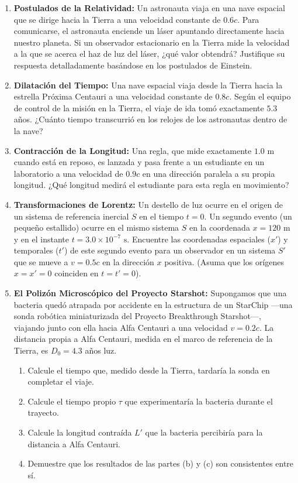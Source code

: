 \documentclass[11pt,a4paper]{book}
\begin{document}
\begin{enumerate}

    \item \textbf{Postulados de la Relatividad:} Un astronauta viaja en una nave espacial que se dirige hacia la Tierra a una velocidad constante de $0.6c$. Para comunicarse, el astronauta enciende un láser apuntando directamente hacia nuestro planeta. Si un observador estacionario en la Tierra mide la velocidad a la que se acerca el haz de luz del láser, ¿qué valor obtendrá? Justifique su respuesta detalladamente basándose en los postulados de Einstein.

    \item \textbf{Dilatación del Tiempo:} Una nave espacial viaja desde la Tierra hacia la estrella Próxima Centauri a una velocidad constante de $0.8c$. Según el equipo de control de la misión en la Tierra, el viaje de ida tomó exactamente $5.3$ años. ¿Cuánto tiempo transcurrió en los relojes de los astronautas dentro de la nave?
    
    \item \textbf{Contracción de la Longitud:} Una regla, que mide exactamente $1.0 \text{ m}$ cuando está en reposo, es lanzada y pasa frente a un estudiante en un laboratorio a una velocidad de $0.9c$ en una dirección paralela a su propia longitud. ¿Qué longitud medirá el estudiante para esta regla en movimiento?

    \item \textbf{Transformaciones de Lorentz:} Un destello de luz ocurre en el origen de un sistema de referencia inercial $S$ en el tiempo $t=0$. Un segundo evento (un pequeño estallido) ocurre en el mismo sistema $S$ en la coordenada $x = 120 \text{ m}$ y en el instante $t = 3.0 \times 10^{-7} \text{ s}$. Encuentre las coordenadas espaciales ($x'$) y temporales ($t'$) de este segundo evento para un observador en un sistema $S'$ que se mueve a $v = 0.5c$ en la dirección $x$ positiva. (Asuma que los orígenes $x=x'=0$ coinciden en $t=t'=0$).

\item \textbf{El Polizón Microscópico del Proyecto Starshot:} Supongamos que una
bacteria quedó atrapada por accidente en la estructura de un StarChip —una sonda
robótica miniaturizada del Proyecto Breakthrough Starshot—, viajando junto con
ella hacia Alfa Centauri a una velocidad $v = 0.2c$. La distancia propia a Alfa
Centauri, medida en el marco de referencia de la Tierra, es $D_0 = 4.3$ años luz.
\label{item:starshot}

\begin{enumerate}
    \item[a)] Calcule el tiempo que, medido desde la Tierra, tardaría la sonda en
    completar el viaje.
    \item[b)] Calcule el tiempo propio $\tau$ que experimentaría la bacteria
    durante el trayecto.
    \item[c)] Calcule la longitud contraída $L'$ que la bacteria percibiría para
    la distancia a Alfa Centauri.
    \item[d)] Demuestre que los resultados de las partes (b) y (c) son
    consistentes entre sí.
\end{enumerate}



\end{enumerate}
\end{document}

